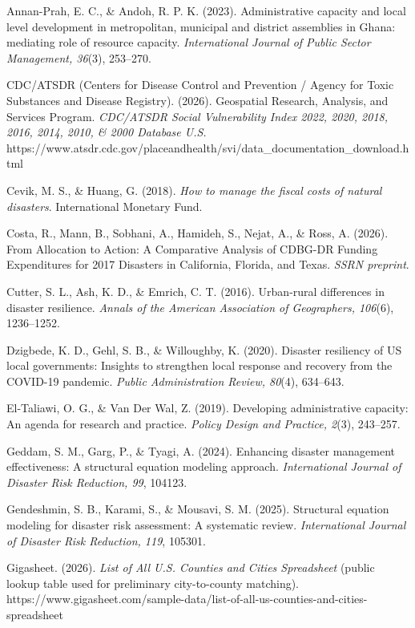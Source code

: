 \documentclass[
  number]{elsarticle}
\begin{document}
Annan-Prah, E. C., \& Andoh, R. P. K. (2023). Administrative capacity
and local level development in metropolitan, municipal and district
assemblies in Ghana: mediating role of resource capacity.
\emph{International Journal of Public Sector Management, 36}(3),
253--270.

CDC/ATSDR (Centers for Disease Control and Prevention / Agency for Toxic
Substances and Disease Registry). (2026). Geospatial Research, Analysis,
and Services Program. \emph{CDC/ATSDR Social Vulnerability Index 2022,
2020, 2018, 2016, 2014, 2010, \& 2000 Database U.S.}
https://www.atsdr.cdc.gov/placeandhealth/svi/data\_documentation\_download.html

Cevik, M. S., \& Huang, G. (2018). \emph{How to manage the fiscal costs
of natural disasters}. International Monetary Fund.

Costa, R., Mann, B., Sobhani, A., Hamideh, S., Nejat, A., \& Ross, A.
(2026). From Allocation to Action: A Comparative Analysis of CDBG-DR
Funding Expenditures for 2017 Disasters in California, Florida, and
Texas. \emph{SSRN preprint}.

Cutter, S. L., Ash, K. D., \& Emrich, C. T. (2016). Urban-rural
differences in disaster resilience. \emph{Annals of the American
Association of Geographers, 106}(6), 1236--1252.

Dzigbede, K. D., Gehl, S. B., \& Willoughby, K. (2020). Disaster
resiliency of US local governments: Insights to strengthen local
response and recovery from the COVID-19 pandemic. \emph{Public
Administration Review, 80}(4), 634--643.

El-Taliawi, O. G., \& Van Der Wal, Z. (2019). Developing administrative
capacity: An agenda for research and practice. \emph{Policy Design and
Practice, 2}(3), 243--257.

Geddam, S. M., Garg, P., \& Tyagi, A. (2024). Enhancing disaster
management effectiveness: A structural equation modeling approach.
\emph{International Journal of Disaster Risk Reduction, 99}, 104123.

Gendeshmin, S. B., Karami, S., \& Mousavi, S. M. (2025). Structural
equation modeling for disaster risk assessment: A systematic review.
\emph{International Journal of Disaster Risk Reduction, 119}, 105301.

Gigasheet. (2026). \emph{List of All U.S. Counties and Cities
Spreadsheet} (public lookup table used for preliminary city-to-county
matching).
https://www.gigasheet.com/sample-data/list-of-all-us-counties-and-cities-spreadsheet
\end{document}
